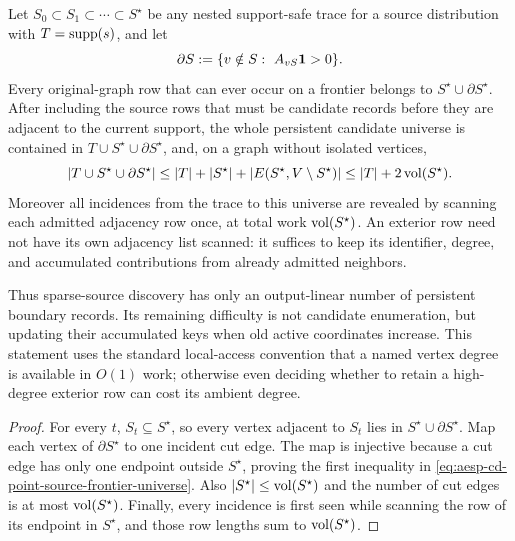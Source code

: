 \begin{lemma}
\label{lem:aesp-cd-point-source-frontier-universe}
Let \(S_0\subset S_1\subset\cdots\subset S^\star\) be any nested
support-safe trace for a source distribution with $T=\operatorname{supp}(s)$, and let
\begin{equation*}
 \partial S:=\{v\notin S:\ A_{vS}\one>0\}.
\end{equation*}
Every original-graph row that can ever occur on a frontier belongs to
\(S^\star\cup\partial S^\star\).  After including the source rows that must
be candidate records before they are adjacent to the current support, the
whole persistent candidate universe is contained in
\(T\cup S^\star\cup\partial S^\star\), and, on a graph without isolated
vertices,
\begin{equation}
 \left|T\cup S^\star\cup\partial S^\star\right|
 \leq |T|+|S^\star|+|E(S^\star,V\setminus S^\star)|
 \leq |T|+2\operatorname{vol}(S^\star).
 \label{eq:aesp-cd-point-source-frontier-universe}
\end{equation}
Moreover all incidences from the trace to this universe are revealed by
scanning each admitted adjacency row once, at total work
\(\operatorname{vol}(S^\star)\).  An exterior row need not have its own adjacency list
scanned: it suffices to keep its identifier, degree, and accumulated
contributions from already admitted neighbors.

Thus sparse-source discovery has only an output-linear number of persistent
boundary records.  Its remaining difficulty is not candidate enumeration,
but updating their accumulated keys when old active coordinates increase.
This statement uses the standard local-access convention that a named
vertex degree is available in \(O(1)\) work; otherwise even deciding whether
to retain a high-degree exterior row can cost its ambient degree.
\end{lemma}

\begin{proof}
For every \(t\), \(S_t\subseteq S^\star\), so every vertex adjacent to
\(S_t\) lies in \(S^\star\cup\partial S^\star\).  Map each vertex of
\(\partial S^\star\) to one incident cut edge.  The map is injective because
a cut edge has only one endpoint outside \(S^\star\), proving the first
inequality in \cref{eq:aesp-cd-point-source-frontier-universe}.  Also
\(|S^\star|\leq\operatorname{vol}(S^\star)\) and the number of cut edges is at most
\(\operatorname{vol}(S^\star)\).  Finally, every incidence is first seen while scanning
the row of its endpoint in \(S^\star\), and those row lengths sum to
\(\operatorname{vol}(S^\star)\).
\end{proof}

